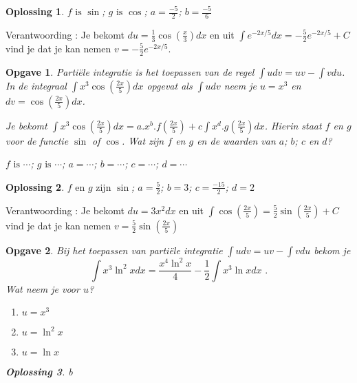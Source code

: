 \documentclass{article}
\newtheorem{opgave}{Opgave}
\newtheorem*{oplossing}{Oplossing}
\begin{document}
\begin{oplossing}
$f \text { is } \sin $; $g \text { is } \cos $; $a = \frac{-5}{2}$; $b= \frac {-5}{6}$
\end{oplossing}

Verantwoording : Je bekomt $du=\frac{1}{3}\cos \left( \frac{x}{3} \right) dx$ en uit $\int e^{-2x/5}dx=-\frac {5}{2} e^{-2x/5}+C$ vind je dat je kan nemen $v=-\frac{5}{2} e^{-2x/5}$.

\begin{opgave}
Parti\"ele integratie is het toepassen van de regel $\int udv = uv - \int vdu$.
In de integraal $\int x^3 \cos \left( \frac{2x}{5}  \right) dx$ opgevat als $\int udv$ neem je $u=x^3$ en $dv=\cos \left( \frac{2x}{5} \right)dx$.

\noindent Je bekomt $\int x^3 \cos \left( \frac{2x}{5}  \right) dx=a.x^b.f\left(  \frac{2x}{5} \right)+c\int x^d.g\left( \frac{2x}{5}  \right)dx$. Hierin staat $f$ en $g$ voor de functie $\sin $ of $\cos $.
Wat zijn $f$ en $g$ en de waarden van $a$; $b$; $c$ en $d$?\vspace{3mm}

\noindent $f \text { is } \cdots $; $g \text { is } \cdots$; $a= \cdots $; $b= \cdots $; $c= \cdots $; $d= \cdots $
\end{opgave}

\begin{oplossing}
$f \text { en } g \text { zijn } \sin $; $a=\frac{5}{2}$; $b=3$; $c=\frac{-15}{2}$; $d=2$
\end{oplossing}

Verantwoording : Je bekomt $du=3x^2dx$ en uit $\int \cos \left( \frac{2x}{5}  \right)=\frac{5}{2} \sin \left( \frac{2x}{5}  \right)+C$ vind je dat je kan nemen $v=\frac{5}{2} \sin \left(  \frac{2x}{5}  \right)$

\begin{opgave}
Bij het toepassen van parti\"ele integratie $\int udv=uv-\int vdu$ bekom je
\[
\int x^3 \ln ^2 xdx=\frac{x^4 \ln^2x}{4}-\frac{1}{2}\int x^3\ln xdx \text { .}
\]
Wat neem je voor $u$?

\begin{enumerate}[a]
\item $u=x^3$
\item $u=\ln^2x$
\item $u=\ln x$
\end{enumerate}

\begin{oplossing}
b
\end{oplossing}


\end{opgave}
\end{document}
